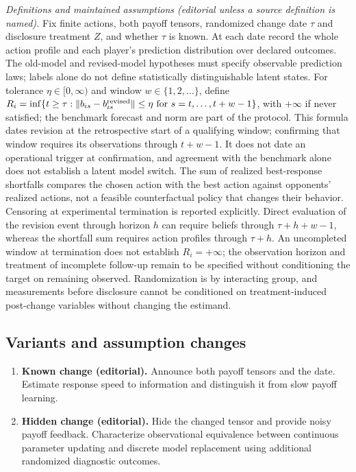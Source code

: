 \documentclass[11pt,a4paper]{article}
\begin{document}
\emph{Definitions and maintained assumptions (editorial unless a source definition is named).} Fix finite actions, both payoff tensors, randomized change date \(\tau\) and disclosure treatment \(Z\), and whether \(\tau\) is known. At each date record the whole action profile and each player’s prediction distribution over declared outcomes. The old-model and revised-model hypotheses must specify observable prediction laws; labels alone do not define statistically distinguishable latent states. For tolerance \(\eta\in[0,\infty)\) and window \(w\in\{1,2,\ldots\}\), define \(R_i=\inf\{t\ge\tau:\|b_{is}-b^{\rm revised}_{is}\|\le\eta\text{ for }s=t,\ldots,t+w-1\}\), with \(+\infty\) if never satisfied; the benchmark forecast and norm are part of the protocol. This formula dates revision at the retrospective start of a qualifying window; confirming that window requires its observations through \(t+w-1\). It does not date an operational trigger at confirmation, and agreement with the benchmark alone does not establish a latent model switch. The sum of realized best-response shortfalls compares the chosen action with the best action against opponents’ realized actions, not a feasible counterfactual policy that changes their behavior. Censoring at experimental termination is reported explicitly. Direct evaluation of the revision event through horizon \(h\) can require beliefs through \(\tau+h+w-1\), whereas the shortfall sum requires action profiles through \(\tau+h\). An uncompleted window at termination does not establish \(R_i=+\infty\); the observation horizon and treatment of incomplete follow-up remain to be specified without conditioning the target on remaining observed. Randomization is by interacting group, and measurements before disclosure cannot be conditioned on treatment-induced post-change variables without changing the estimand.
\subsection*{Variants and assumption changes}
\begin{enumerate}
\item \textbf{Known change (editorial).} Announce both payoff tensors and the date. Estimate response speed to information and distinguish it from slow payoff learning.
\item \textbf{Hidden change (editorial).} Hide the changed tensor and provide noisy payoff feedback. Characterize observational equivalence between continuous parameter updating and discrete model replacement using additional randomized diagnostic outcomes.
\end{enumerate}
\end{document}
